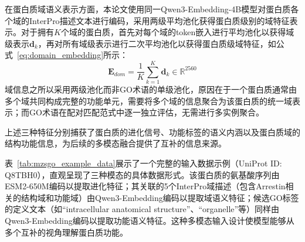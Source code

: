 在蛋白质域语义表示方面，本论文使用同一Qwen3-Embedding-4B模型对蛋白质各个域的InterPro\cite{blum2025interpro}描述文本进行编码，采用两级平均池化获得蛋白质级别的域特征表示。对于拥有$K$个域的蛋白质，首先对每个域的token嵌入进行平均池化以获得域级表示$\mathbf{d}_k$，再对所有域级表示进行二次平均池化以获得蛋白质级域特征，如公式~\eqref{eq:domain_embedding}所示：
\begin{equation}
\label{eq:domain_embedding}
    \mathbf{E}_{dom} = \frac{1}{K} \sum_{k=1}^{K} \mathbf{d}_k \in \mathbb{R}^{2560}
\end{equation}
域信息之所以采用两级池化而非GO术语的单级池化，原因在于一个蛋白质通常由多个域共同构成完整的功能单元，需要将多个域的信息聚合为该蛋白质的统一域表示；而GO术语在配对匹配范式中逐一独立评估，无需进行多实例聚合。

上述三种特征分别捕获了蛋白质的进化信号、功能标签的语义内涵以及蛋白质域的结构功能信息，为后续的多模态融合提供了互补的信息来源。

表~\ref{tab:mzsgo_example_data}展示了一个完整的输入数据示例（UniProt ID: Q8TBH0），直观呈现了三种模态的具体数据形式。该蛋白质的氨基酸序列由ESM2-650M编码以提取进化特征；其关联的5个InterPro域描述（包含Arrestin相关的结构域和功能域）由Qwen3-Embedding编码以提取域语义特征；候选GO标签的定义文本（如``intracellular anatomical structure''、``organelle''等）同样由Qwen3-Embedding编码以提取功能语义特征。这种多模态输入设计使模型能够从多个互补的视角理解蛋白质功能。

